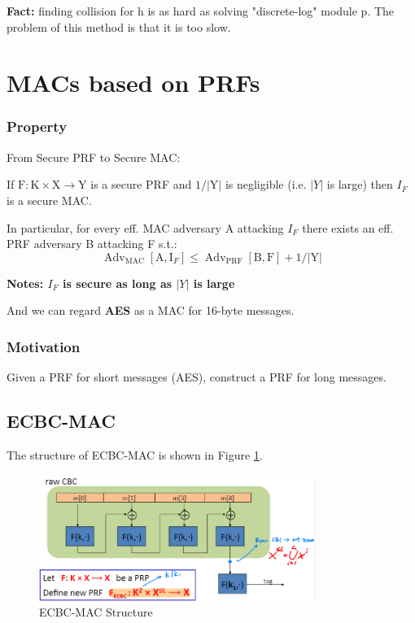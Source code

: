\textbf{Fact: } finding collision for h is as hard as solving "discrete-log" module p. The problem of this method is that it is too slow.



\section{MACs based on PRFs}

\subsubsection{Property}

\begin{theorem}  From Secure PRF to Secure MAC:

    If $\mathrm{F}: \mathrm{K} \times \mathrm{X} \rightarrow \mathrm{Y}$ is a secure PRF and $1 /|\mathrm{Y}|$ is negligible (i.e. $|Y|$ is large) then $I_{F}$ is a secure MAC.
    
    In particular, for every eff. MAC adversary A attacking $I_F$ there exists an eff. PRF adversary B attacking F s.t.:
    $$
    \operatorname{Adv}_{\mathrm{MAC}}\left[\mathrm{A}, \mathrm{I}_{F}\right] \leq \operatorname{Adv}_{\mathrm{PRF}}[\mathrm{B}, \mathrm{F}]+1 /|\mathrm{Y}|
    $$
    
\end{theorem}

\textbf{Notes: $I_F$ is secure as long as $|Y|$ is large}

And we can regard \textbf{AES} as a MAC for 16-byte messages.

\subsubsection{Motivation}

Given a PRF for short messages (AES), construct a PRF for long messages.


\subsection{ECBC-MAC}

The structure of ECBC-MAC is shown in Figure \ref{fig: Lecture 4: ECBC-MAC Structure}.

\begin{figure}[h]
    \centering
    \includegraphics[width=0.8\textwidth]{Stanford_Crypto_1/fig/04_Integrity/CBC_MAC Structure.png}
    \caption{ECBC-MAC Structure}
    \label{fig: Lecture 4: ECBC-MAC Structure}
\end{figure}


